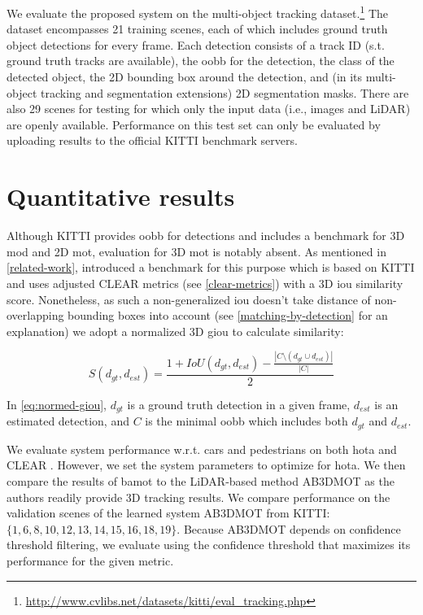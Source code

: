 \documentclass[headsepline, hidelinks, footsepline, footinclude=false, oneside, fontsize=11pt, paper=a4, listof=totoc, bibliography=totoc]{scrbook}
\begin{document}
We evaluate the proposed system on the multi-object tracking dataset.\footnote{\url{http://www.cvlibs.net/datasets/kitti/eval\_tracking.php}}
The dataset encompasses 21 training scenes, each of which includes ground truth object detections for every frame.
Each detection consists of a track ID (s.t. ground truth tracks are available), the \gls{oobb} for the detection, the class of the detected object, 
the 2D bounding box around the detection, and (in its multi-object tracking and segmentation extensions) 2D segmentation masks.
There are also 29 scenes for testing for which only the input data (i.e., images and LiDAR) are openly available.
Performance on this test set can only be evaluated by uploading results to the official KITTI benchmark servers.

\section{Quantitative results}
\label{sec:orge52f5ee}
    Although KITTI provides \gls{oobb} for detections and includes a benchmark for 3D \gls{mod} and 2D \gls{mot}, evaluation for 3D \gls{mot} is notably absent.
As mentioned in \cref{related-work}, \cite{wengBaseline3DMultiObject2019} introduced a benchmark for this purpose which is based on KITTI and uses adjusted CLEAR metrics (see \cref{clear-metrics})
with a 3D \gls{iou} similarity score.
Nonetheless, as such a non-generalized \gls{iou} doesn't take distance of non-overlapping bounding boxes into account (see \cref{matching-by-detection} for an explanation) 
we adopt a normalized 3D \gls{giou} \cite{rezatofighiGeneralizedIntersectionUnion2019} to calculate similarity: 

\begin{equation}
\label{eq:normed-giou}
S(d_{gt}, d_{est}) = \frac{1 + IoU(d_{gt}, d_{est}) - \frac{|C \setminus (d_{gt} \cup d_{est})|}{|C|}}{2}
\end{equation}

In \cref{eq:normed-giou}, \(d_{gt}\) is a ground truth detection in a given frame, \(d_{est}\) is an estimated detection, and \(C\) is the minimal \gls{oobb} which includes both \(d_{gt}\) and \(d_{est}\).

We evaluate system performance w.r.t. cars and pedestrians on both \gls{hota} \cite{luitenHOTAHigherOrder2021} and CLEAR \cite{bernardinEvaluatingMultipleObject2008}.
However, we set the system parameters to optimize for \gls{hota}. 
We then compare the results of \gls{bamot} to the LiDAR-based method AB3DMOT \cite{wengBaseline3DMultiObject2019} as the authors readily provide 3D tracking results.
We compare performance on the validation scenes of the learned system AB3DMOT from KITTI: \(\{1, 6, 8, 10, 12, 13, 14, 15, 16, 18, 19\}\).
Because AB3DMOT depends on confidence threshold filtering, we evaluate using the confidence threshold that maximizes its performance for the given metric.
\end{document}
